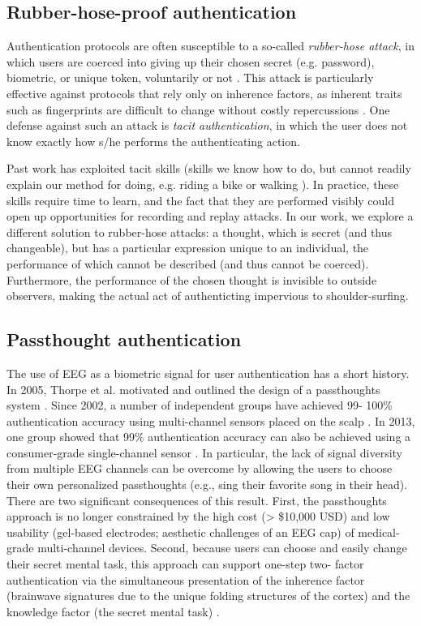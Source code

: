 \documentclass[sigconf]{acmart}
\begin{document}
\subsection{Rubber-hose-proof authentication}
\label{sec:orgf212369}

Authentication protocols are often susceptible to a so-called \emph{rubber-hose attack}, in which users are coerced into giving up their chosen secret (e.g. password), biometric, or unique token, voluntarily or not \cite{Bojinov2012,Martinovic2012}. This attack is particularly effective against protocols that rely only on inherence factors, as inherent traits such as fingerprints are difficult to change without costly repercussions \cite{Spielberg2002}. One defense against such an attack is \emph{tacit authentication}, in which the user does not know exactly how s/he performs the authenticating action.

Past work has exploited tacit skills (skills we know how to do, but cannot readily explain our method for doing, e.g. riding a bike or walking \cite{Bojinov2012}). In practice, these skills require time to learn, and the fact that they are performed visibly could open up opportunities for recording and replay attacks. In our work, we explore a different solution to rubber-hose attacks: a thought, which is secret (and thus changeable), but has a particular expression unique to an individual, the performance of which cannot be described  (and thus cannot be coerced).
Furthermore, the performance of the chosen thought is invisible to outside observers, making the actual act of authenticting impervious to shoulder-surfing.

\subsection{Passthought authentication}
\label{sec:org67a2a76}

The use of EEG as a biometric signal for user authentication has a short history.
In 2005, Thorpe et al. motivated and outlined the design of a passthoughts system \cite{Thorpe2005}. Since 2002, a number of independent groups have achieved 99- 100\% authentication accuracy using multi-channel sensors placed on the scalp \cite{Poulos2002,Marcel2007a,Palaniappan2008,Ashby2011}.
In 2013, one group showed that 99\% authentication accuracy can also be
achieved using a consumer-grade single-channel sensor \cite{Chuang2013b}. In particular, the
lack of signal diversity from multiple EEG channels can be overcome by allowing
the users to choose their own personalized passthoughts (e.g., sing their favorite
song in their head). There are two significant consequences of this result. First,
the passthoughts approach is no longer constrained by the high cost (> \$10,000 USD)
and low usability (gel-based electrodes; aesthetic challenges of an EEG cap) of
medical-grade multi-channel devices. Second, because users can choose and
easily change their secret mental task, this approach can support one-step two-
factor authentication via the simultaneous presentation of the inherence factor
(brainwave signatures due to the unique folding structures of the cortex) and the
knowledge factor (the secret mental task) \cite{Chuang2014}.
\end{document}
